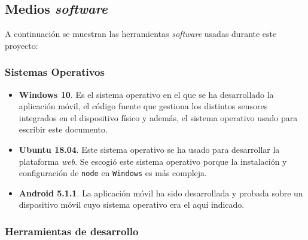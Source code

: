 \subsection{Medios \textit{software}}

A continuación se muestran las herramientas \textit{software} usadas durante este proyecto:

\subsubsection{Sistemas Operativos}

\begin{itemize}
\item \textbf{Windows 10}. Es el sistema operativo en el que se ha desarrollado la aplicación móvil, el código fuente que gestiona los distintos sensores integrados en el dispositivo físico y además, el sistema operativo usado para escribir este documento.
\item \textbf{Ubuntu 18.04}. Este sistema operativo se ha usado para desarrollar la plataforma \textit{web}. Se escogió este sistema operativo porque la instalación y configuración de \texttt{node} en \texttt{Windows} es más compleja.
\item \textbf{Android 5.1.1}. La aplicación móvil ha sido desarrollada y probada sobre un dispositivo móvil cuyo sistema operativo era el aquí indicado.
\end{itemize}

\subsubsection{Herramientas de desarrollo}

